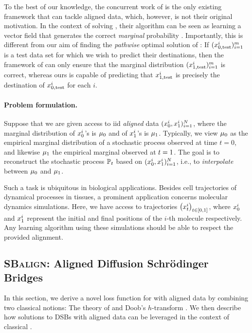 To the best of our knowledge, the concurrent work of \citet{tong2023conditional} is the only existing framework that can tackle aligned data, which, however, is not their original motivation. In the context of solving , their algorithm can be seen as learning a vector field that generates the correct \emph{marginal} probability \citep[cf.][Proposition 4.3]{tong2023conditional}. Importantly, this is different from our aim of finding the \emph{pathwise} optimal solution of : If $(x^i_{0,\textup{test}})_{i=1}^m$ is a test data set for which we wish to predict their destinations, then the framework of \citet{tong2023conditional} can only ensure that the marginal distribution $(x^i_{1,\textup{test}})_{i=1}^m$ is correct, whereas ours is capable of predicting that $x^i_{1,\textup{test}}$ is precisely the destination of $x^i_{0,\textup{test}}$ for each $i$. 

\paragraph{Problem formulation.}

Suppose that we are given access to \acrshort{iid} \emph{aligned} data $(x_0^i,x_1^i)_{i=1}^N$, where the marginal distribution of $x^i_0$'s is $\mu_0$ and of $x_1^i$'s is $\mu_1$. Typically, we view $\mu_0$ as the empirical marginal distribution of a stochastic process observed at time $t= 0$, and likewise $\mu_1$ the empirical marginal observed at $t=1$. The goal is to reconstruct the stochastic process $\mathbb{P}_{{t}}$ based on $(x_0^i,x_1^i)_{i=1}^N$, i.e., to \emph{interpolate} between $\mu_0$ and $\mu_1$.

Such a task is ubiquitous in biological applications. Besides cell trajectories of dynamical processes in tissues, a prominent application concerns molecular dynamics simulations. Here, we have access to trajectories $\left(x_t^i\right)_{t \in [0, 1]}$, where $x_0^i$ and $x_1^i$ represent the initial and final positions of the $i$-th molecule respectively. Any learning algorithm using these simulations should be able to respect the provided alignment. 

\subsection{\textsc{SBalign}: Aligned Diffusion Schr{\"o}dinger Bridges}

In this section, we derive a novel loss function for  with aligned data by combining two classical notions: The theory of  \citep{schrodinger1931umkehrung,leonard2013survey,chen2021stochastic} and Doob's $h$-transform \citep{doob1984classical, rogers2000diffusions}. We then describe how solutions to DSBs with aligned data can be leveraged in the context of classical .

